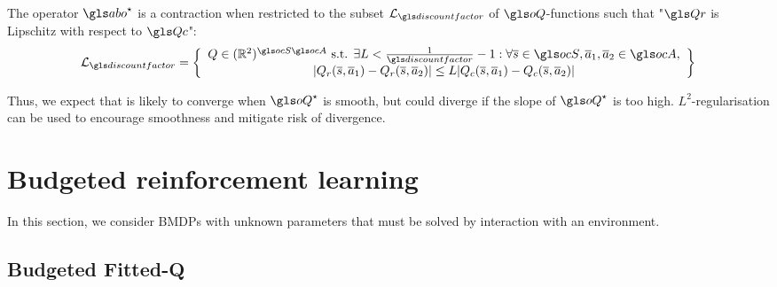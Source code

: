 \begin{theorem}
	\begin{leftbar}[theorembar]
	\label{rmk:contractivity-smooth}
	The operator $\abo^{\star}$ is a contraction when restricted to the subset $\cL_{\discountfactor}$ of $\oQ$-functions such that "$\Qr$ is Lipschitz with respect to $\Qc$":
	\begin{equation}
	\cL_\discount = \left\{\begin{array}{cc}
	Q\in(\Real^2)^{\ocS\ocA}\text{ s.t. }\exists L<\frac{1}{\discount}-1: \forall \os\in\ocS,\oa_1,\oa_2\in\ocA,   \\
	|Q_r(\os,\oa_1) - Q_r(\os,\oa_2)| \leq L|Q_c(\os,\oa_1) - Q_c(\os,\oa_2)|
	\end{array}\right\}
	\end{equation}
	\end{leftbar}
\end{theorem}

Thus, we expect that  is likely to converge when $\oQ^{\star}$ is smooth, but could diverge if the slope of $\oQ^{\star}$ is too high.  $L^2$-regularisation can be used to encourage smoothness and mitigate risk of divergence.


\section{Budgeted reinforcement learning}

\label{sec:brl}

In this section, we consider \glspl{BMDP} with unknown parameters that must be solved by interaction with an environment. 

\subsection{Budgeted Fitted-Q}
\label{subsec:bftq}

